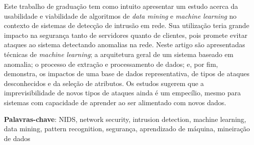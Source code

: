 %
%

Este trabalho de graduação tem como intuito apresentar um estudo acerca da usabilidade e viabilidade de
algoritmos de \textit{data mining} e \textit{machine learning} no contexto de sistemas de detecção de
intrusão em rede. Sua utilização teria grande impacto na segurança tanto de servidores quanto de clientes,
pois promete evitar ataques ao sistema detectando anomalias na rede.
Neste artigo são apresentadas técnicas de \textit{machine learning}; a arquitetura geral
de um sistema baseado em anomalia; o processo de extração e processamento de dados; e, por fim, demonstra,
os impactos de uma base de dados representativa, de tipos de ataques desconhecidos e da seleção de atributos.
Os estudos sugerem que a imprevisibilidade de novos tipos de ataques ainda é um empecílio, mesmo para
sistemas com capacidade de aprender ao ser alimentado com novos dados.

\noindent \textbf{Palavras-chave}: NIDS, network security, intrusion detection, machine learning, data mining,
pattern recognition, segurança, aprendizado de máquina, mineiração de dados

